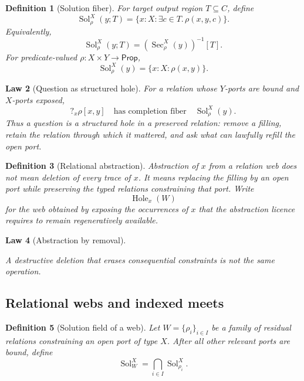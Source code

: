 \documentclass[11pt,oneside]{article}
\newtheorem{definition}{Definition}[section]
\newtheorem{law}[definition]{Law}
\newcommand{\Prop}{\mathsf{Prop}}
\begin{document}
\begin{definition}[Solution fiber]
For target output region \(T\subseteq C\), define
\[
\boxed{
\operatorname{Sol}^{X}_{\rho}(y;T)
=
\{x:X:\exists c\in T.\,\rho(x,y,c)\}.
}
\]
Equivalently,
\[
\operatorname{Sol}^{X}_{\rho}(y;T)
=
\left(\operatorname{Sec}^{X}_{\rho}(y)\right)^{-1}[T].
\]
For predicate-valued \(\rho:X\times Y\to\Prop\),
\[
\operatorname{Sol}^{X}_{\rho}(y)
=
\{x:X:\rho(x,y)\}.
\]
\end{definition}

\begin{law}[Question as structured hole]
For a relation whose \(Y\)-ports are bound and \(X\)-ports exposed,
\[
\boxed{
?_x\rho[x,y]
\quad\text{has completion fiber}\quad
\operatorname{Sol}^{X}_{\rho}(y).
}
\]
Thus a question is a structured hole in a preserved relation: remove a filling, retain the relation through which it mattered, and ask what can lawfully refill the open port.
\end{law}

\begin{definition}[Relational abstraction]
Abstraction of \(x\) from a relation web does not mean deletion of every trace of \(x\).  It means replacing the filling by an open port while preserving the typed relations constraining that port.  Write
\[
\boxed{
\operatorname{Hole}_x(W)
}
\]
for the web obtained by exposing the occurrences of \(x\) that the abstraction licence requires to remain regeneratively available.
\end{definition}

\begin{law}[Abstraction by removal]
\begin{center}
\end{center}
A destructive deletion that erases consequential constraints is not the same operation.
\end{law}

\subsection{Relational webs and indexed meets}

\begin{definition}[Solution field of a web]
Let \(W=\{\rho_i\}_{i\in I}\) be a family of residual relations constraining an open port of type \(X\).  After all other relevant ports are bound, define
\[
\boxed{
\operatorname{Sol}^{X}_{W}
=
\bigcap_{i\in I}\operatorname{Sol}^{X}_{\rho_i}.
}
\]
\end{definition}
\end{document}
